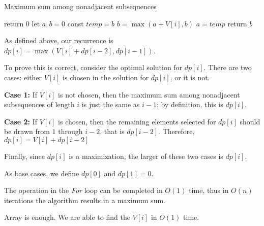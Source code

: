 \begin{algorithm}[]
  \caption{Maximum sum among nonadjacent subsequences}
  {
    return 0\;
  }
  let $a, b = 0$\;
  {
    const $temp=b$\;
    $b = \max(a+V[i], b)$\;
    $a = temp$
  }
  return $b$\;
\end{algorithm}


As defined above, our recurrence is 
$dp[i] = \max (V[i] + dp[i-2], dp[i-1])$.

To prove this is correct, consider the optimal solution for $dp[i]$. There are two cases: either $V[i]$ is chosen in the solution for $dp[i]$, or it is not.

\textbf{Case 1:} If $V[i]$ is not chosen, then the maximum sum among nonadjacent subsequences of length $i$ is just the same as $i-1$; by definition, this is $dp[i]$.

\textbf{Case 2:} If $V[i]$ is chosen, then the remaining elements selected for $dp[i]$ should be drawn from $1$ through $i-2$, that is $dp[i-2]$. Therefore, $dp[i] = V[i] + dp[i-2]$

Finally, since $dp[i]$ is a maximization, the larger of these two cases is $dp[i]$.

As base cases, we define $dp[0]$ and $dp[1]=0$.


The operation in the \textit{For} loop can be completed in $O(1)$ time, thus in $O(n)$ iterations the algorithm results in a maximum sum.


Array is enough. We are able to find the $V[i]$ in $O(1)$ time.


